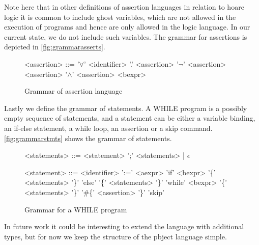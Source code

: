 Note here that in other definitions of assertion languages in relation to hoare logic it is common to include ghost variables, which are not allowed in the execution of programs and hence are only allowed in the logic language. In our current state, we do not include such variables.
The grammar for assertions is depicted in \autoref{fig:grammarasserts}.
\begin{figure}[h!]
\centering
\begin{grammar}
<assertion> ::= '$\forall$' <identifier> '.' <assertion>
\alt '$\neg$' <assertion>
\alt <assertion> '$\wedge$' <assertion>
\alt <bexpr>
\end{grammar}
\label{fig:grammarasserts}
\caption{Grammar of assertion language}
\end{figure}

Lastly we define the grammar of statements. A WHILE program is a possibly empty sequence of statements, and a statement can be either a variable binding, an if-else statement, a while loop, an assertion or a skip command. \autoref{fig:grammarstmts} shows the grammar of statements.

\begin{figure}[h!]
\centering
\begin{grammar}
<statements> ::= <statement> ';' <statements> | $\epsilon$

<statement> ::= <identifier> ':=' <aexpr>
\alt 'if' <bexpr> '\{' <statements> '\}' 'else' '\{' <statements> '\}'
\alt 'while' <bexpr> '\{' <statements> '\}'
\alt '\#\{' <assertion> '\}'
\alt 'skip'
\end{grammar}
\label{fig:grammarstmts}
\caption{Grammar for a WHILE program}
\end{figure}

In future work it could be interesting to extend the language with additional types, but for now we keep the structure of the pbject language simple.
